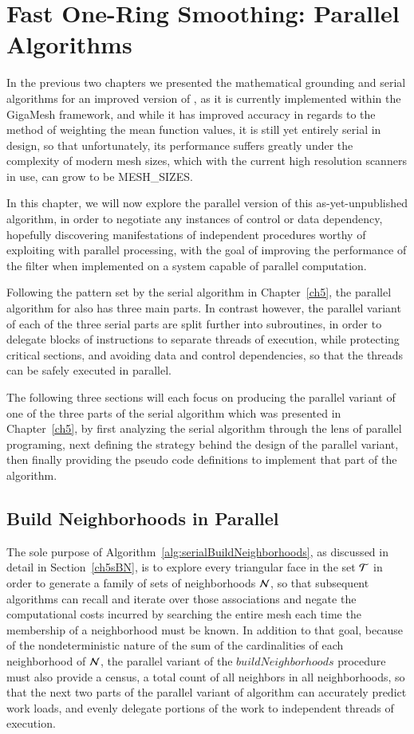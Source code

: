 \chapter{Fast One-Ring Smoothing: Parallel Algorithms}
\label{ch6}
In the previous two chapters we presented the mathematical grounding and serial algorithms for an improved version of , as it is currently implemented within the GigaMesh framework, and while it has improved accuracy in regards to the method of weighting the mean function values, it is still yet entirely serial in design, so that unfortunately, its performance suffers greatly under the complexity of modern mesh sizes, which with the current high resolution scanners in use, can grow to be MESH\_SIZES.

In this chapter, we will now explore the parallel version of this as-yet-unpublished algorithm, in order to negotiate any instances of control or data dependency, hopefully discovering manifestations of independent procedures worthy of exploiting with parallel processing, with the goal of improving the performance of the filter when implemented on a system capable of parallel computation.

Following the pattern set by the serial algorithm in Chapter~\ref{ch5}, the parallel algorithm for  also has three main parts. In contrast however, the parallel variant of each of the three serial parts are split further into subroutines, in order to delegate blocks of instructions to separate threads of execution, while protecting critical sections, and avoiding data and control dependencies, so that the threads can be safely executed in parallel.

The following three sections will each focus on producing the parallel variant of one of the three parts of the serial algorithm which was presented in Chapter~\ref{ch5}, by first analyzing the serial algorithm through the lens of parallel programing, next defining the strategy behind the design of the parallel variant, then finally providing the pseudo code definitions to implement that part of the algorithm.

%
%
%
%
\section{Build Neighborhoods in Parallel}
\label{ch6sBNP}
The sole purpose of Algorithm~\ref{alg:serialBuildNeighborhoods}, as discussed in detail in Section~\ref{ch5sBN}, is to explore every triangular face in the set $\mathcal{T}$ in order to generate a family of sets of neighborhoods $\mathcal{N}$, so that subsequent algorithms can recall and iterate over those associations and negate the computational costs incurred by searching the entire mesh each time the membership of a neighborhood must be known. In addition to that goal, because of the nondeterministic nature of the sum of the cardinalities of each neighborhood of $\mathcal{N}$, the parallel variant of the $\mathit{buildNeighborhoods}$ procedure must also provide a census, a total count of all neighbors in all neighborhoods, so that the next two parts of the parallel variant of  algorithm can accurately predict work loads, and evenly delegate portions of the work to independent threads of execution.

